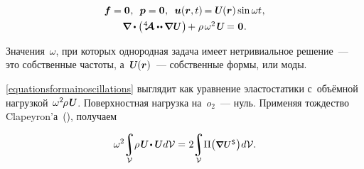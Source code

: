 \begin{otherlanguage}{russian}
\nopagebreak\vspace{-0.25em}\begin{equation}\label{equationsformainoscillations}
\begin{array}{c}
\bm{f} = \bm{0} \hspace{.1ex} ,
\:\;
\bm{p} = \bm{0} \hspace{.1ex} ,
\:\;
\bm{u}(\bm{r}, t) \hspace{-0.2ex} = \mathboldU(\bm{r}) \operatorname{sin} \omega t \hspace{.1ex} ,
\\[.4em]
%
\boldnabla \dotp \left( \hspace{.1ex} \stiffnesstensor \dotdotp \hspace{-0.12ex} \boldnabla \hspace{.1ex} \mathboldU \hspace{.2ex} \right) \hspace{-0.2ex}
+ \hspace{.1ex} \rho \hspace{.3ex} \omega^2 \hspace{.25ex} \mathboldU \hspace{-0.1ex}
= \hspace{.1ex} \bm{0} \hspace{.1ex} .
\end{array}
\end{equation}

\vspace{-0.15em} \noindent Значения~$\omega$, при которых однородная задача имеет нетривиальное решение~--- это собственные частоты, а~${\mathboldU(\bm{r})}$~--- собственные формы, или моды.

\eqref{equationsformainoscillations} выглядит как уравнение эластостатики с~объёмной нагрузкой~${\omega^2 \hspace{-0.2ex} \rho \hspace{.25ex} \mathboldU \hspace{-0.1ex}}$. Поверхностная нагрузка на~${o_2}$~--- нуль. Применяя тождество Clapeyron’а~(), получаем

\nopagebreak\vspace{-0.2em}\begin{equation}
\omega^2 \hspace{-0.2em}
\integral\displaylimits_{\mathcal{V}} \hspace{-0.5ex}
\rho \hspace{.25ex} \mathboldU \hspace{-0.2ex} \dotp \mathboldU
\hspace{.1ex} d\mathcal{V}
= \hspace{.1ex}
2 \hspace{-0.2em}
\integral\displaylimits_{\mathcal{V}} \hspace{-0.5ex}
\Pi \bigl( \scalebox{0.9}{$\boldnabla \hspace{.1ex} \mathboldU \hspace{.2ex}^{\mathsf{S}}$} \hspace{.1ex} \bigr) \hspace{.1ex} d\mathcal{V} .
\end{equation}


\end{otherlanguage}
